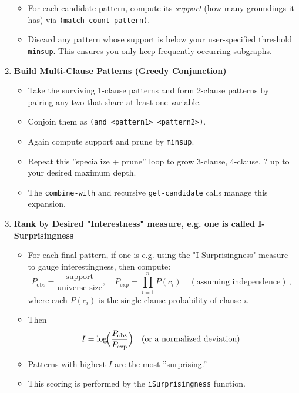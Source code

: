 \documentclass{article}
\begin{document}
\begin{mdframed}
\begin{enumerate}
\begin{itemize}
    \item For each candidate pattern, compute its \emph{support} (how many groundings it has)
    via \verb|(match-count pattern)|.  
    \item Discard any pattern whose support is below
    your user-specified threshold \verb|minsup|.  This ensures you only keep
    frequently occurring subgraphs.
      \end{itemize}
  \item \textbf{Build Multi-Clause Patterns (Greedy Conjunction)}
    \begin{itemize}
    \item Take the surviving 1-clause patterns and form 2-clause patterns by pairing
    any two that share at least one variable.  
    \item Conjoin them as
    \verb|(and <pattern1> <pattern2>)|. 
    \item  Again compute support and prune by
    \verb|minsup|. 
    \item  Repeat this ''specialize + prune'' loop to grow 3-clause,
    4-clause, ? up to your desired maximum depth.  
    \item The \texttt{combine-with}
    and recursive \texttt{get-candidate} calls manage this expansion.
      \end{itemize}
  \item \textbf{Rank by Desired "Interestness" measure, e.g. one is called I-Surprisingness}
    \begin{itemize}
    \item For each final pattern, if one is e.g. using the "I-Surprisingness" measure to gauge interestingness, then compute:
    $$
      P_{\mathrm{obs}} = \frac{\text{support}}{\text{universe-size}}
      ,\quad
      P_{\mathrm{exp}} = \prod_{i=1}^{n}P(c_i)
      \quad(\text{assuming independence})\,,
    $$
    where each \(P(c_i)\) is the single-clause probability of clause \(i\).
    \item Then
    $$
      I = \log\!\Bigl(\frac{P_{\mathrm{obs}}}{P_{\mathrm{exp}}}\Bigr)
      \quad\text{(or a normalized deviation)}.
    $$
    \item Patterns with highest \(I\) are the most ''surprising.''  
    \item 
    This scoring is
    performed by the \texttt{iSurprisingness} function.
      \end{itemize}
\end{enumerate}
\end{mdframed}
\end{document}
